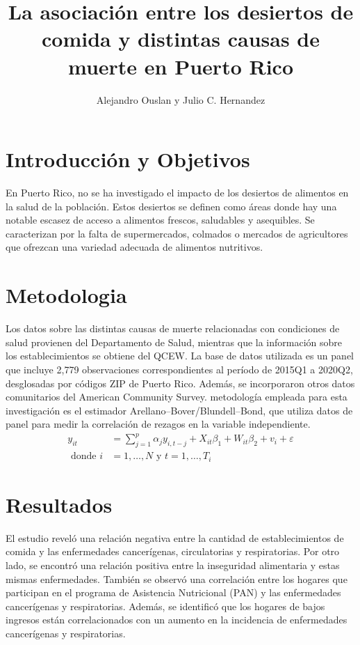 \documentclass[10pt, oneside]{article}
\title{La asociación entre los desiertos de comida y distintas causas de muerte en Puerto Rico}
\author{Alejandro Ouslan y Julio C. Hernandez}
\affil{USDA y LEADING Hispanics}
\begin{document}
\maketitle
\tableofcontents

\vspace{.25in}

\section{Introducción y Objetivos}

En Puerto Rico, no se ha investigado el impacto de los desiertos de alimentos en la salud de la población. Estos desiertos se definen como áreas donde
hay una notable escasez de acceso a alimentos frescos, saludables y asequibles. Se caracterizan por la falta de supermercados, colmados o mercados de
agricultores que ofrezcan una variedad adecuada de alimentos nutritivos.

\section{Metodologia}

Los datos sobre las distintas causas de muerte relacionadas con condiciones de salud provienen del Departamento de Salud, mientras que la información sobre los
establecimientos se obtiene del QCEW. La base de datos utilizada es un panel que incluye 2,779 observaciones correspondientes al período de 2015Q1 a 2020Q2, desglosadas por códigos ZIP de Puerto Rico.
Además, se incorporaron otros datos comunitarios del American Community Survey. metodología empleada para esta investigación es el estimador Arellano–Bover/Blundell–Bond, que utiliza datos de panel para medir la
correlación de rezagos en la variable independiente.
\[
	\begin{split}
		y_{it} &= \sum_{j=1}^{p} \alpha_j y_{i,t-j} + X_{it} \beta_1 + W_{it} \beta_2 + v_i + \varepsilon \\
		\text{ donde } i &= 1, \ldots, N \text{ y } t = 1, \ldots, T_i
	\end{split}
\]
\section{Resultados}
El estudio reveló una relación negativa entre la cantidad de establecimientos de comida y las enfermedades cancerígenas, circulatorias y respiratorias.
Por otro lado, se encontró una relación positiva entre la inseguridad alimentaria y estas mismas enfermedades. También se observó una correlación entre
los hogares que participan en el programa de Asistencia Nutricional (PAN) y las enfermedades cancerígenas y respiratorias. Además, se identificó que
los hogares de bajos ingresos están correlacionados con un aumento en la incidencia de enfermedades cancerígenas y respiratorias.
\end{document}
